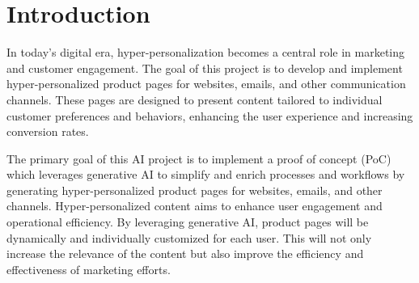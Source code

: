 \documentclass[%
pdftex,
oneside,			%
11pt,				%
parskip=half,		%
headheight = 12pt,	%
headsepline,		%
footsepline,		%
footheight = 16pt,	%
abstracton,		%
DIV=calc,		%
BCOR=8mm,		%
headinclude=false,	%
footinclude=false,	%
listof=totoc,		%
toc=bibliography,	%
]{scrreprt}	%
\begin{document}
\begin{spacing}{1.1}
    \begingroup
    
        \renewcommand*{\chapterpagestyle}{empty}
        \pagestyle{empty}

        \setcounter{tocdepth}{3}
        
        \tableofcontents
        \clearpage
    \endgroup
\end{spacing}
\newpage

\cleardoublepage 
\listoffigures
\clearpage

\lstlistoflistings %
\clearpage


\chapter{Introduction}


    In today's digital era, hyper-personalization becomes a central role in marketing and customer engagement. 
    The goal of this project is to develop and implement hyper-personalized product pages for websites, emails, and other communication channels.
    These pages are designed to present content tailored to individual customer preferences and behaviors, enhancing the user experience and increasing conversion rates.

    The primary goal of this AI project is to implement a proof of concept (PoC) which leverages generative AI to simplify and enrich processes and workflows by generating hyper-personalized product pages for websites, emails, and other channels.
    Hyper-personalized content aims to enhance user engagement and operational efficiency. 
    By leveraging generative AI, product pages will be dynamically and individually customized for each user. 
    This will not only increase the relevance of the content but also improve the efficiency and effectiveness of marketing efforts.
\end{document}
